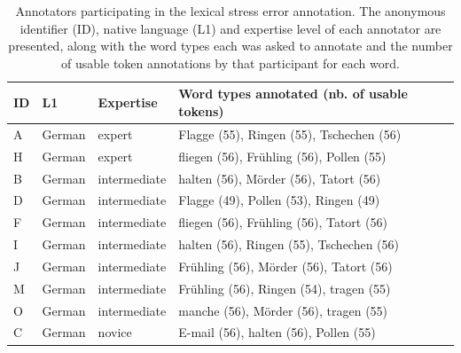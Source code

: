 	
	\begin{table}[p]
		\centering
		\caption[Annotators]{Annotators participating in the lexical stress error annotation. The anonymous identifier (ID), native language (L1) and expertise level of each annotator are presented, along with the word types each was asked to annotate and the number of usable token annotations by that participant for each word.}
		
		\begin{tabularx}{\textwidth}{lllX}
		\toprule
		ID & L1 & Expertise & Word types annotated (nb. of usable tokens) \\
		\midrule
		A	&	German	& expert & Flagge (55),  Ringen (55), Tschechen (56) \\
		

		H & German & expert &		 fliegen (56), Fr\"{u}hling (56),  Pollen (55) \\		
		
		
		B	&	German	& intermediate & 	halten (56),  M\"{o}rder (56),     Tatort (56) \\
		
		

		D &	German & intermediate &		Flagge (49),  Pollen (53), Ringen (49)	 %
		\\
		

		
		F & 	German	 & intermediate & 	 fliegen (56), Fr\"{u}hling (56), Tatort (56)	 \\
		

		

		I & 	German & intermediate &		halten (56), Ringen (55), Tschechen (56)	 \\
		
		J &	German	 & intermediate & Fr\"{u}hling (56), M\"{o}rder (56),    Tatort (56) \\
		

		
		
		M & 	German	 & intermediate & Fr\"{u}hling (56), Ringen (54),   tragen (55)	 \\
		
		O	& German	 & intermediate & manche (56), Mörder (56),    tragen (55) \\




		
		C & German & novice & 	 E-mail (56), halten (56),  Pollen (55)	 \\
		

\end{tabularx}
\end{table}
